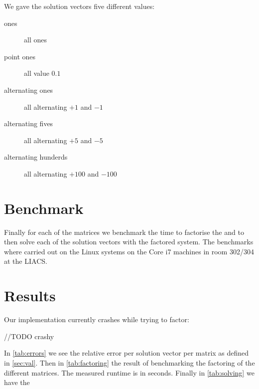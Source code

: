 \documentclass[10pt]{article}
\begin{document}
We gave the solution vectors five different values:

\begin{description}
    \item [ones] all ones
    \item [point ones] all value $0.1$
    \item [alternating ones] all alternating $+1$ and $-1$
    \item [alternating fives] all alternating $+5$ and $-5$
    \item [alternating hunderds] all alternating $+100$ and $-100$
\end{description}

\section{Benchmark}
Finally for each of the matrices we benchmark the time to factorise the and to then solve each of the solution vectors with the factored system. The benchmarks where carried out on the Linux systems on the Core i7 machines in room 302/304 at the LIACS.

\section{Results}
Our implementation currently crashes while trying to factor:

//TODO crashy

In \autoref{tab:errors} we see the relative error per solution vector per matrix as defined in \autoref{sec:val}. Then in \autoref{tab:factoring} the result of benchmarking the factoring of the different matrices. The measured runtime is in seconds. Finally in \autoref{tab:solving} we have the 
\end{document}
